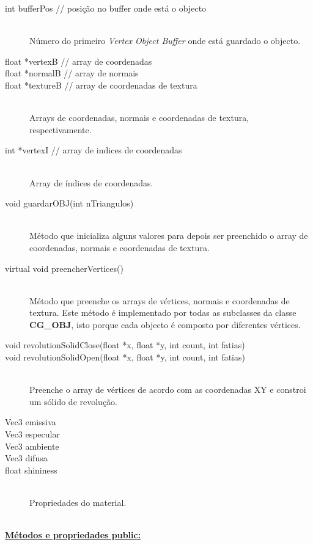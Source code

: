 \documentclass[a5paper,onecolumn, 11pt]{article}
\begin{document}
\begin{description}
	\item[int bufferPos   // posição no buffer onde está o objecto] \hfill \\
	Número do primeiro \textit{Vertex Object Buffer} onde está guardado o objecto.

	\item[float *vertexB  // array de coordenadas]
	\item[float *normalB  // array de normais]
	\item[float *textureB // array de coordenadas de textura] \hfill \\
	Arrays de coordenadas, normais e coordenadas de textura, respectivamente.

	\item[int *vertexI    // array de indices de coordenadas] \hfill \\
	Array de índices de coordenadas.

	\item[void guardarOBJ(int nTriangulos)] \hfill \\
	Método que inicializa alguns valores para depois ser preenchido o array de coordenadas, normais e coordenadas de textura.

	\item[virtual void preencherVertices()] \hfill \\
	Método que preenche os arrays de vértices, normais e coordenadas de textura. Este método é implementado por todas as subclasses da classe \textbf{CG\_OBJ}, isto porque cada objecto é composto por diferentes vértices.

	\item[void revolutionSolidClose(float *x, float *y, int count, int fatias)]
	\item[void revolutionSolidOpen(float *x, float *y, int count, int fatias)] \hfill \\
	Preenche o array de vértices de acordo com as coordenadas XY e constroi um sólido de revolução. 

	\item[Vec3 emissiva]
	\item[Vec3 especular]
	\item[Vec3 ambiente]
	\item[Vec3 difusa]
	\item[float shininess] \hfill \\
	Propriedades do material.
\end{description}

\hfill \\ \underline{\textbf{Métodos e propriedades public:}}
\end{document}
